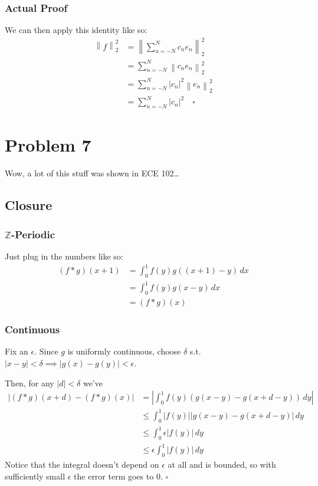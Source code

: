 \documentclass[12pt]{article}
\newcommand{\Z}{\mathbb{Z}}
\newcommand{\norm}[1]{\left\lVert#1\right\rVert}
\begin{document}
\subsubsection{Actual Proof}

We can then apply this identity like so:
\begin{align*}
  \norm{f}_2^2
   & = \norm{\sum_{n=-N}^{N} c_ne_n}_2^2     \\
   & = \sum_{n=-N}^{N} \norm{c_ne_n}_2^2     \\
   & = \sum_{n=-N}^{N} |c_n|^2\norm{e_n}_2^2 \\
   & = \sum_{n=-N}^{N} |c_n|^2\quad\square
\end{align*}

\pagebreak

\section{Problem 7}

Wow, a lot of this stuff was shown in ECE 102\dots

\subsection{Closure}

\subsubsection{\texorpdfstring{$\Z$}{Z}-Periodic}

Just plug in the numbers like so:
\begin{align*}
  (f * g)(x+1)
   & = \int_{0}^{1} f(y)g((x+1)-y)\,dx \\
   & = \int_{0}^{1} f(y)g(x-y)\,dx     \\
   & = (f*g)(x)
\end{align*}

\subsubsection{Continuous}

Fix an $\epsilon$.
Since $g$ is uniformly continuous, choose $\delta$ s.t. $|x-y| < \delta \implies |g(x)-g(y)| < \epsilon$.

Then, for any $|d| < \delta$ we've
\begin{align*}
  |(f*g)(x+d)-(f*g)(x)|
   & = \left|\int_{0}^{1} f(y)(g(x-y)-g(x+d-y))\,dy\right| \\
   & \le \int_{0}^{1} |f(y)||g(x-y)-g(x+d-y)|\,dy          \\
   & \le \int_{0}^{1} \epsilon|f(y)|\,dy                   \\
   & \le \epsilon \int_{0}^{1} |f(y)|\,dy
\end{align*}
Notice that the integral doesn't depend on $\epsilon$ at all and is bounded,
so with sufficiently small $\epsilon$ the error term goes to $0$. $\square$
\end{document}

